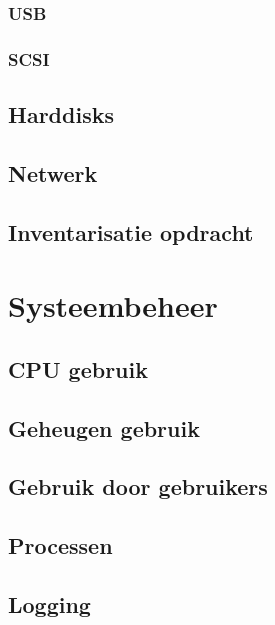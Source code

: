 \documentclass[a4paper,12pt,twoside,openright,titlepage]{book}
\begin{document}
\subsection{USB}

\subsection{SCSI}

\section{Harddisks}





\section{Netwerk}

\section{Inventarisatie opdracht}


\chapter{Systeembeheer}

\section{CPU gebruik}

\section{Geheugen gebruik}

\section{Gebruik door gebruikers}

\section{Processen}
\section{Logging}

\end{document}
